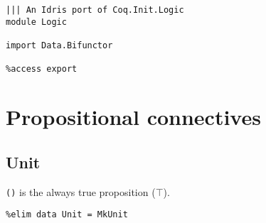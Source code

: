 \documentclass{acm_proc_article-sp}
\begin{document}



% 
% 

\begin{verbatim}
||| An Idris port of Coq.Init.Logic
module Logic

import Data.Bifunctor

%access export
\end{verbatim}

\section{Propositional connectives}\label{propositional-connectives}

\subsection{Unit}\label{unit}

\texttt{()} is the always true proposition (\(\top\)).

\begin{verbatim}
%elim data Unit = MkUnit
\end{verbatim}
\end{document}
